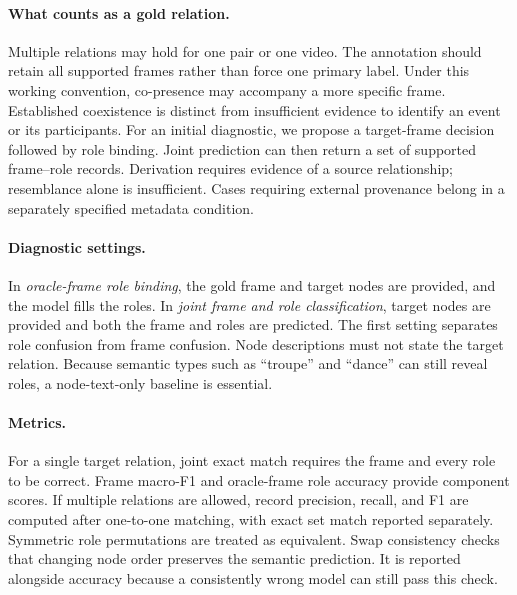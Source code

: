 \paragraph{What counts as a gold relation.}
Multiple relations may hold for one pair or one video.
The annotation should retain all supported frames rather than force one primary label.
Under this working convention, co-presence may accompany a more specific
frame. Established coexistence is distinct from insufficient evidence to
identify an event or its participants.
For an initial diagnostic, we propose a target-frame decision followed by role binding.
Joint prediction can then return a set of supported frame--role records.
Derivation requires evidence of a source relationship; resemblance alone is insufficient.
Cases requiring external provenance belong in a separately specified metadata condition.

\paragraph{Diagnostic settings.}
In \emph{oracle-frame role binding}, the gold frame and target nodes are provided, and the model fills the roles.
In \emph{joint frame and role classification}, target nodes are provided and both the frame and roles are predicted.
The first setting separates role confusion from frame confusion.
Node descriptions must not state the target relation.
Because semantic types such as ``troupe'' and ``dance'' can still reveal roles, a node-text-only baseline is essential.

\paragraph{Metrics.}
For a single target relation, joint exact match requires the frame and every role to be correct.
Frame macro-F1 and oracle-frame role accuracy provide component scores.
If multiple relations are allowed, record precision, recall, and F1 are computed after one-to-one matching, with exact set match reported separately.
Symmetric role permutations are treated as equivalent.
Swap consistency checks that changing node order preserves the semantic prediction.
It is reported alongside accuracy because a consistently wrong model can still pass this check.

